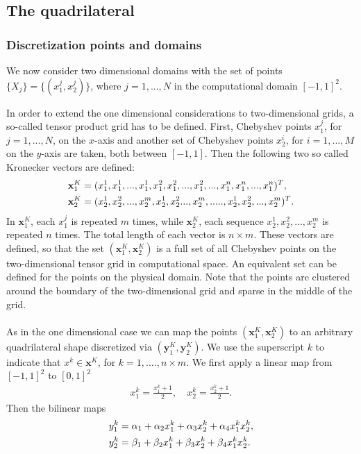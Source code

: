 \documentclass[11pt, a4paper]{article}
\theoremstyle{definition}
\begin{document}
\subsection{The quadrilateral}
\subsubsection{Discretization points and domains}
We now consider two dimensional domains with the set of points $\{X_j\} = \{(x_1^j,x_2^j)\}$, where $j = 1, ..., N$ in the computational domain $[-1,1]^2$.

In order to extend the one dimensional considerations to two-dimensional grids, a so-called tensor product grid has to be defined. First, Chebyshev points $x_1^j$, for $j=1,...,N$, on the $x$-axis and another set of Chebyshev points $x_2^i$, for $i=1,...,M$ on the $y$-axis are taken, both between $[-1,1]$. 
Then the following two so called Kronecker vectors are defined:
\begin{align}\label{eq:KroneckerVec}
	\mathbf{x}_1^{K}&=(x_1^1,x_1^1,...,x_1^1,x_1^2,x_1^2,...,x_1^2,...,x_1^n,x_1^n,...,x_1^n)^T,\\
	\mathbf{x}_2^{K}&=(x_2^1,x_2^2,...,x_2^m,x_2^1,x_2^2...,x_2^m,.....,x_2^1,x_2^2,...,x_2^m)^T.\notag
\end{align} 
In $\mathbf{x}_1^{K}$, each $x_1^j$ is repeated $m$ times, while $\mathbf{x}_2^{K}$, each sequence $x_2^1,x_2^2,...,x_2^m$ is repeated $n$ times. The total length of each vector is $n \times m$. 
These vectors are defined, so that the set $(\mathbf{x}_1^{K},\mathbf{x}_2^{K})$ is a full set of all Chebyshev points on the two-dimensional tensor grid in computational space. An equivalent set can be defined for the points on the physical domain. Note that the points are clustered around the boundary of the two-dimensional grid and sparse in the middle of the grid.
\\
\\
As in the one dimensional case we can map the points $(\mathbf{x}_1^{K},\mathbf{x}_2^{K})$ to an arbitrary quadrilateral shape discretized via $(\mathbf{y}_1^{K},\mathbf{y}_2^{K})$. We use the superscript $k$ to indicate that $x^k \in \mathbf{x}^{K}$, for $k = 1,....,n \times m$. We first apply a linear map from $[-1,1]^2$ to $[0,1]^2$ 
\begin{align*}
	x_1^k = \frac{x_1^k+1}{2}, \quad
	x_2^k = \frac{x_2^k+1}{2}.
\end{align*}
Then the bilinear maps
\begin{align}\label{eq:bilinear1}
	y_1^k &= \alpha_1 + \alpha_2 x_1^k + \alpha_3 x_2^k + \alpha_4 x_1^k x_2^k,\\
	y_2^k &= \beta_1 + \beta_2 x_1^k + \beta_3 x_2^k + \beta_4 x_1^k x_2^k. \notag
\end{align}
\end{document}
